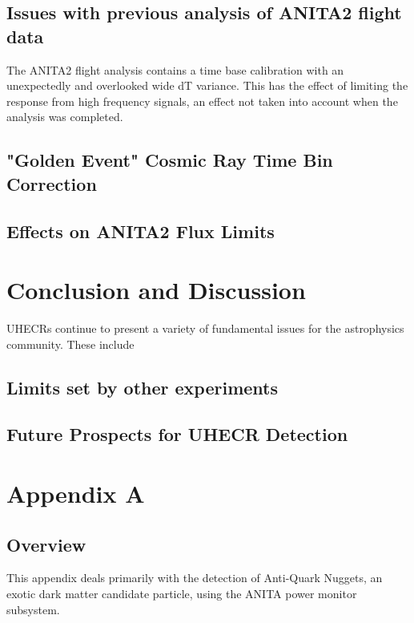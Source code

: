 \section{Issues with previous analysis of ANITA2 flight data}
	The ANITA2 flight analysis contains a time base calibration with an unexpectedly and overlooked wide dT variance.  This has the effect of limiting the response from high frequency signals, an effect not taken into account when the analysis was completed.

\section{"Golden Event" Cosmic Ray Time Bin Correction}

\section{Effects on ANITA2 Flux Limits}
			
			
\chapter{Conclusion and Discussion}
	UHECRs continue to present a variety of fundamental issues for the astrophysics community.  These include 
\section{Limits set by other experiments}

\section{Future Prospects for UHECR Detection}


	
			
			
			
			
\chapter{Appendix A}
\section{Overview}
	This appendix deals primarily with the detection of Anti-Quark Nuggets, an exotic dark matter candidate particle, using the ANITA power monitor subsystem.
	
